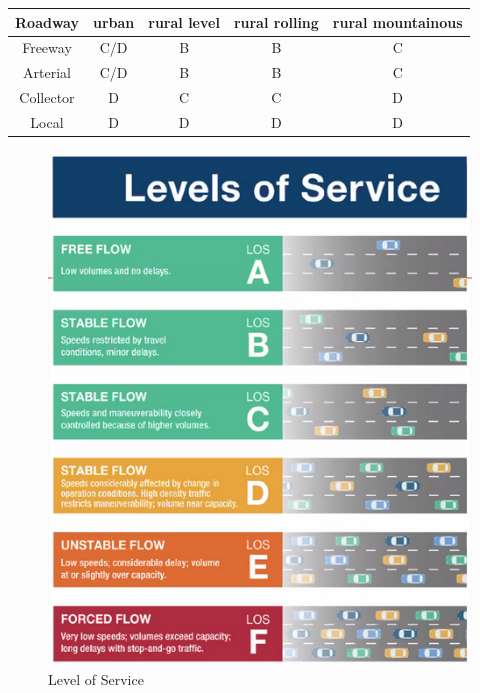 \documentclass{article}
\begin{document}
  \begin{tabular}{|c|c|c|c|c|}
    Roadway & urban & rural level & rural rolling & rural mountainous\\
    \hline
    Freeway & C/D   & B & B & C\\
    Arterial & C/D  & B & B & C\\
    Collector & D   & C & C & D\\
    Local & D       & D & D & D\\
  \end{tabular}
  \begin{figure}[h!]
    \includegraphics[width=\linewidth]{LOS.png}
    \caption{Level of Service}
    \label{fig:image-LOS}
  \end{figure}
\end{document}
